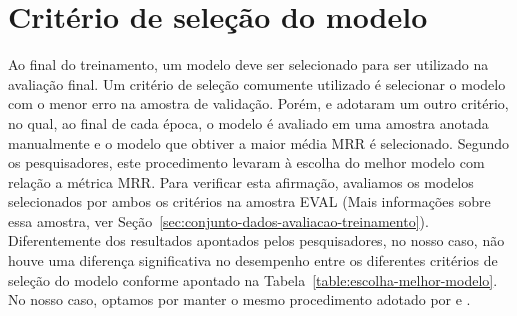 \section{}

\section{Critério de seleção do modelo}
\label{sec:ape-criterio-de-selecao-do-modelo-experimento}

Ao final do treinamento, um modelo deve ser selecionado para ser utilizado na avaliação final. Um critério de seleção comumente utilizado é selecionar o modelo com o menor erro na amostra de validação. Porém, \cite{iyer-etal-2016-summarizing} e \cite{yao-2018} adotaram um outro critério, no qual, ao final de cada época, o modelo é avaliado em uma amostra anotada manualmente e o modelo que obtiver a maior média MRR é selecionado. Segundo os pesquisadores, este procedimento levaram à escolha do melhor modelo com relação a métrica MRR. Para verificar esta afirmação, avaliamos os modelos selecionados por ambos os critérios na amostra EVAL (Mais informações sobre essa amostra, ver Seção~\ref{sec:conjunto-dados-avaliacao-treinamento}). Diferentemente dos resultados apontados pelos pesquisadores, no nosso caso, não houve uma diferença significativa no desempenho entre os diferentes critérios de seleção do modelo conforme apontado na Tabela~\ref{table:escolha-melhor-modelo}. No nosso caso, optamos por manter o mesmo procedimento adotado por \cite{iyer-etal-2016-summarizing} e \cite{yao-2018}.


